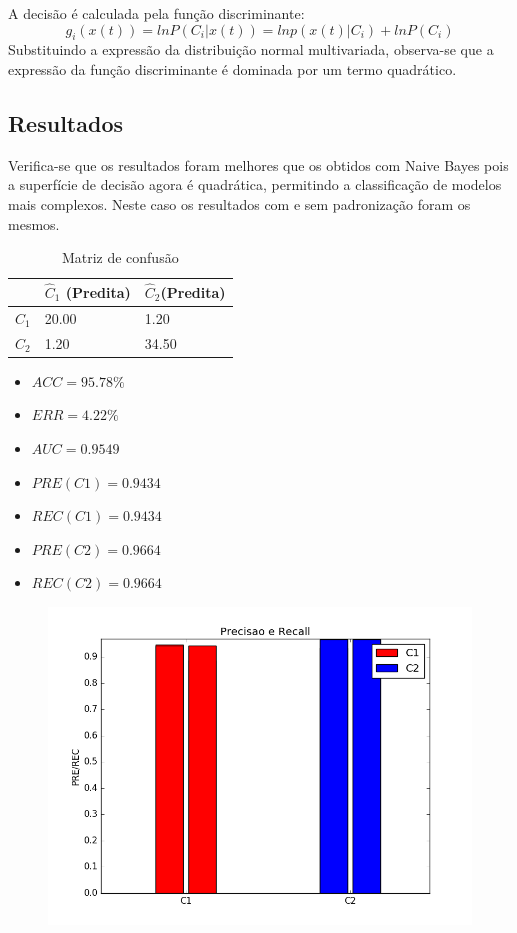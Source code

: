 \documentclass[11pt,a4paper]{article}
\numberwithin{equation}{section}
\begin{document}
A decisão é calculada pela função discriminante:
\[ g_i(x(t))= ln P(C_i|x(t))= ln p(x(t)|C_i)+ ln P(C_i)\]
Substituindo a expressão da distribuição normal multivariada, observa-se que a expressão da função discriminante é dominada por um termo quadrático.

\subsection{Resultados}
Verifica-se que os resultados foram melhores que os obtidos com Naive Bayes pois a superfície de decisão agora é quadrática, permitindo a classificação de modelos mais complexos. Neste caso os resultados com e sem padronização foram os mesmos. 
\begin{table}[H]
\centering
\caption{Matriz de confusão}
\begin{tabular}{l l l}
\hline
 & \textbf{$\hat{C}_1$ (Predita)} & \textbf{$\hat{C}_2$(Predita)}\\
\hline
$C_1$ & 20.00&1.20\\ 
$C_2$ &  1.20&34.50\\ 
\hline
\end{tabular}
\end{table}

\begin{minipage}{.5\textwidth}
\begin{itemize}
\item $ACC = 95.78 \%$
\item $ERR =  4.22 \%$
\item $AUC = 0.9549 $
\item $PRE(C1) = 0.9434$
\item $REC(C1) = 0.9434$
\item $PRE(C2) = 0.9664$
\item $REC(C2) = 0.9664$
\end{itemize}
\end{minipage}%
\begin{minipage}{.5\textwidth}
\begin{figure}[H]
\centering
  \includegraphics[width=\linewidth]{../img/quad_bayes_rec.png}
  \label{fig:percep}
\end{figure}
\end{minipage}%
\end{document}
